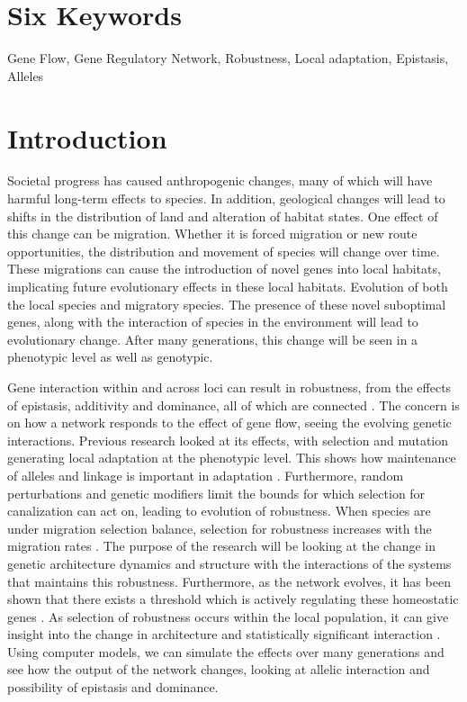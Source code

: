 \documentclass[11pt]{article}
\begin{document}


\newpage

\linenumbers

\section{Six Keywords}
Gene Flow, Gene Regulatory Network, Robustness, Local adaptation, Epistasis, Alleles

\section{Introduction}
Societal progress has caused anthropogenic changes, many of which will have harmful long-term effects to species. In addition, geological changes will lead to shifts in the distribution of land and alteration of habitat states. One effect of this change can be migration. Whether it is forced migration or new route opportunities, the distribution and movement of species will change over time. These migrations can cause the introduction of novel genes into local habitats, implicating future evolutionary effects in these local habitats. Evolution of both the local species and migratory species. The presence of these novel suboptimal genes, along with the interaction of species in the environment will lead to evolutionary change. After many generations, this change will be seen in a phenotypic level as well as genotypic.

Gene interaction within and across loci can result in robustness, from the effects of epistasis, additivity and dominance, all of which are connected \cite{omholt2000gene}. The concern is on how a network responds to the effect of gene flow, seeing the evolving genetic interactions. Previous research looked at its effects, with selection and mutation generating local adaptation at the phenotypic level. This shows how maintenance of alleles and linkage is important in adaptation \cite{yeaman2011genetic}. Furthermore, random perturbations and genetic modifiers limit the bounds for which selection for canalization can act on, leading to evolution of robustness. When species are under migration selection balance, selection for robustness increases with the migration rates \cite{proulx2005opportunity}. The purpose of the research will be looking at the change in genetic architecture dynamics and structure with the interactions of the systems that maintains this robustness. Furthermore, as the network evolves, it has been shown that there exists a threshold which is actively regulating these homeostatic genes \cite{gjuvsland2007threshold}.  As selection of robustness occurs within the local population, it can give insight into the change in architecture and statistically significant interaction \cite{gjuvsland2007statistical}. Using computer models, we can simulate the effects over many generations and see how the output of the network changes, looking at allelic interaction and possibility of epistasis and dominance.
\end{document}
